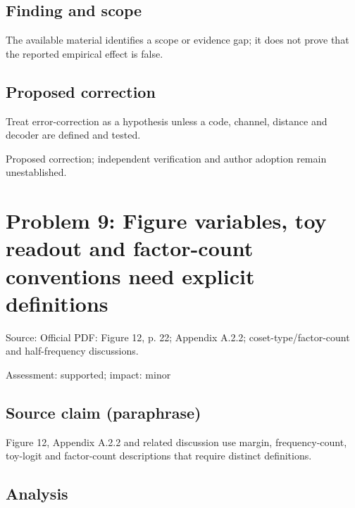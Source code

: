 \documentclass[11pt]{article}
\begin{document}
\subsection*{Finding and scope}

The available material identifies a scope or evidence gap; it does not prove that the reported empirical effect is false.

\subsection*{Proposed correction}

Treat error-correction as a hypothesis unless a code, channel, distance and decoder are defined and tested.

Proposed correction; independent verification and author adoption remain unestablished.

\section*{Problem 9: Figure variables, toy readout and factor-count conventions need explicit definitions}

Source: Official PDF: Figure 12, p. 22; Appendix A.2.2; coset-type/factor-count and half-frequency discussions.

Assessment: supported; impact: minor

\subsection*{Source claim (paraphrase)}

Figure 12, Appendix A.2.2 and related discussion use margin, frequency-count, toy-logit and factor-count descriptions that require distinct definitions.

\subsection*{Analysis}
\end{document}
